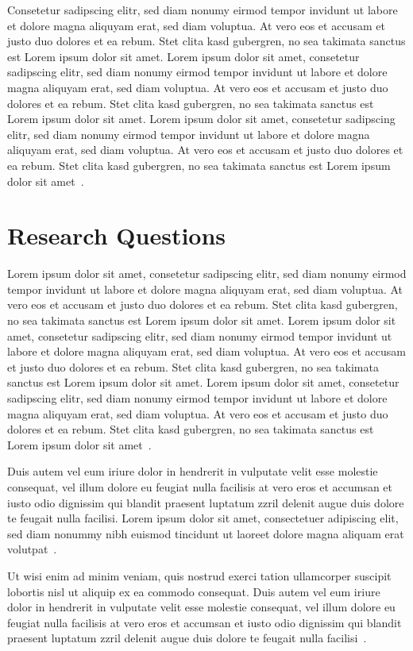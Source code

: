 Consetetur sadipscing elitr,  sed diam nonumy eirmod tempor invidunt ut labore
et dolore magna aliquyam erat, sed diam voluptua. At vero eos et accusam et
justo duo dolores et ea rebum. Stet clita kasd gubergren, no sea takimata
sanctus est Lorem ipsum dolor sit amet. Lorem ipsum dolor sit amet, consetetur
sadipscing elitr,  sed diam nonumy eirmod tempor invidunt ut labore et dolore
magna aliquyam erat, sed diam voluptua. At vero eos et accusam et justo duo
dolores et ea rebum. Stet clita kasd gubergren, no sea takimata sanctus est
Lorem ipsum dolor sit amet. Lorem ipsum dolor sit amet, consetetur sadipscing
elitr,  sed diam nonumy eirmod tempor invidunt ut labore et dolore magna
aliquyam erat, sed diam voluptua. At vero eos et accusam et justo duo dolores
et ea rebum. Stet clita kasd gubergren, no sea takimata sanctus est Lorem ipsum
dolor sit amet~\cite{hui:tdboa}.

\section{Research Questions}
Lorem ipsum dolor sit amet, consetetur sadipscing elitr,  sed diam nonumy eirmod
tempor invidunt ut labore et dolore magna aliquyam erat, sed diam voluptua. At
vero eos et accusam et justo duo dolores et ea rebum. Stet clita kasd gubergren,
no sea takimata sanctus est Lorem ipsum dolor sit amet. Lorem ipsum dolor sit
amet, consetetur sadipscing elitr,  sed diam nonumy eirmod tempor invidunt ut
labore et dolore magna aliquyam erat, sed diam voluptua. At vero eos et accusam
et justo duo dolores et ea rebum. Stet clita kasd gubergren, no sea takimata
sanctus est Lorem ipsum dolor sit amet. Lorem ipsum dolor sit amet, consetetur
sadipscing elitr,  sed diam nonumy eirmod tempor invidunt ut labore et dolore
magna aliquyam erat, sed diam voluptua. At vero eos et accusam et justo duo
dolores et ea rebum. Stet clita kasd gubergren, no sea takimata sanctus est
Lorem ipsum dolor sit amet~\cite{john:tmamr}.

Duis autem vel eum iriure dolor in hendrerit in vulputate velit esse molestie
consequat, vel illum dolore eu feugiat nulla facilisis at vero eros et accumsan
et iusto odio dignissim qui blandit praesent luptatum zzril delenit augue duis
dolore te feugait nulla facilisi. Lorem ipsum dolor sit amet, consectetuer
adipiscing elit, sed diam nonummy nibh euismod tincidunt ut laoreet dolore
magna aliquam erat volutpat~\cite{kary:mlaba}.

Ut wisi enim ad minim veniam, quis nostrud exerci tation ullamcorper suscipit
lobortis nisl ut aliquip ex ea commodo consequat. Duis autem vel eum iriure
dolor in hendrerit in vulputate velit esse molestie consequat, vel illum dolore
eu feugiat nulla facilisis at vero eros et accumsan et iusto odio dignissim qui
blandit praesent luptatum zzril delenit augue duis dolore te feugait nulla
facilisi~\cite{levi:taass}.

